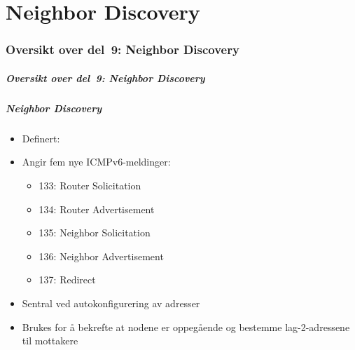 \part{Neighbor Discovery}

\begin{frame}
  \partpage
\end{frame}

\section*{Oversikt over del~9: Neighbor Discovery}
\begin{frame}[allowframebreaks]
  \frametitle{Oversikt over del~9: Neighbor Discovery}
  \tableofcontents
\end{frame}

\begin{frame}
  \frametitle{Neighbor Discovery}
  \begin{itemize}
  \item Definert: 
  \item Angir fem nye ICMPv6-meldinger:
    \begin{itemize}
    \item 133: Router Solicitation
    \item 134: Router Advertisement
    \item 135: Neighbor Solicitation
    \item 136: Neighbor Advertisement
    \item 137: Redirect
    \end{itemize}
  \item Sentral ved autokonfigurering av adresser
  \item Brukes for å bekrefte at nodene er oppegående og bestemme
    lag-2-adressene til mottakere
  \end{itemize}
\end{frame}

